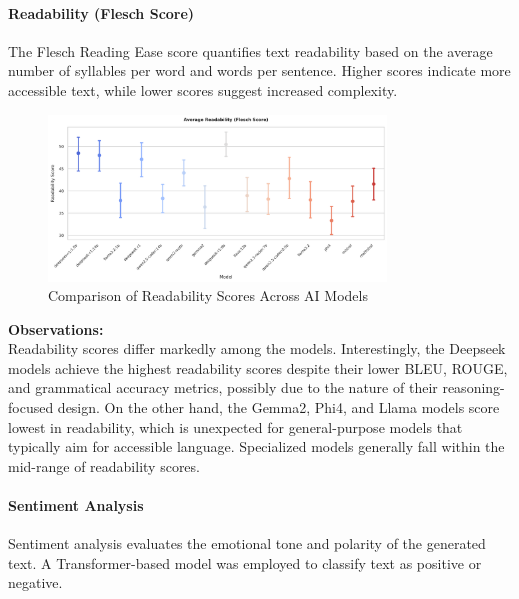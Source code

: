 \paragraph{Readability (Flesch Score)}

The Flesch Reading Ease score quantifies text readability based on the average number of syllables per word and words per sentence. Higher scores indicate more accessible text, while lower scores suggest increased complexity.

\begin{figure}[H]
  \centering
  \includegraphics[width=0.8\textwidth]{figures/scores/readability.png}
  \caption{Comparison of Readability Scores Across AI Models}
  \label{fig:readability}
\end{figure}

\textbf{Observations:} \\
Readability scores differ markedly among the models. Interestingly, the Deepseek models achieve the highest readability scores despite their lower BLEU, ROUGE, and grammatical accuracy metrics, possibly due to the nature of their reasoning-focused design. On the other hand, the Gemma2, Phi4, and Llama models score lowest in readability, which is unexpected for general-purpose models that typically aim for accessible language. Specialized models generally fall within the mid-range of readability scores.

\paragraph{Sentiment Analysis}

Sentiment analysis evaluates the emotional tone and polarity of the generated text. A Transformer-based model was employed to classify text as positive or negative.

